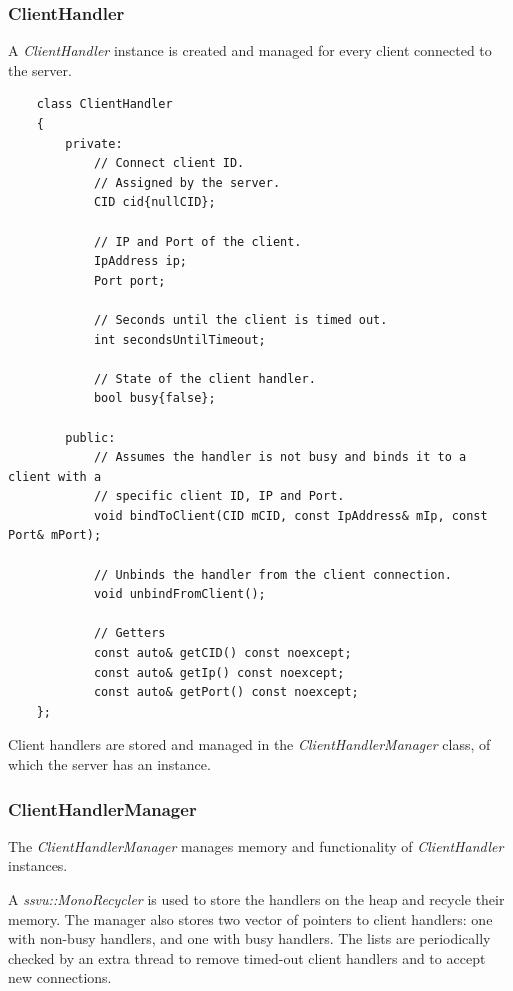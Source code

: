 \documentclass{report}
\begin{document}
                \subsubsection{ClientHandler}

                    A \emph{ClientHandler} instance is created and managed for every client connected to the server.

\begin{verbatim}
    class ClientHandler
    {
        private:
            // Connect client ID. 
            // Assigned by the server.
            CID cid{nullCID};

            // IP and Port of the client.
            IpAddress ip;
            Port port;

            // Seconds until the client is timed out.
            int secondsUntilTimeout;
            
            // State of the client handler.
            bool busy{false};

        public:
            // Assumes the handler is not busy and binds it to a client with a
            // specific client ID, IP and Port.
            void bindToClient(CID mCID, const IpAddress& mIp, const Port& mPort);

            // Unbinds the handler from the client connection.
            void unbindFromClient();

            // Getters
            const auto& getCID() const noexcept;
            const auto& getIp() const noexcept;
            const auto& getPort() const noexcept;
    };
\end{verbatim}

                    Client handlers are stored and managed in the \emph{ClientHandlerManager} class, of which the server has an instance.

                \subsubsection{ClientHandlerManager}

                    The \emph{ClientHandlerManager} manages memory and functionality of \emph{ClientHandler} instances.
                    
                    A \emph{ssvu::MonoRecycler} is used to store the handlers on the heap and recycle their memory.
                    The manager also stores two vector of pointers to client handlers: one with non-busy handlers, and one with busy handlers.
                    The lists are periodically checked by an extra thread to remove timed-out client handlers and to accept new connections.
\end{document}
